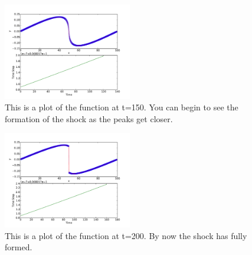 \documentclass[11pt,letterpaper]{article}
\begin{document}
\begin{figure}[bth]
\centering
\includegraphics[width=0.5\textwidth]{t=150.pdf}
\caption{This is a plot of the function at t=150. You can begin to see the formation of the shock as the peaks get closer.}
\label{fig:simpleplot2}
\end{figure}

\begin{figure}[bth]
\centering
\includegraphics[width=0.5\textwidth]{t=200.pdf}
\caption{This is a plot of the function at t=200. By now the shock has fully formed.}
\label{fig:simpleplot2}
\end{figure}
\end{document}
